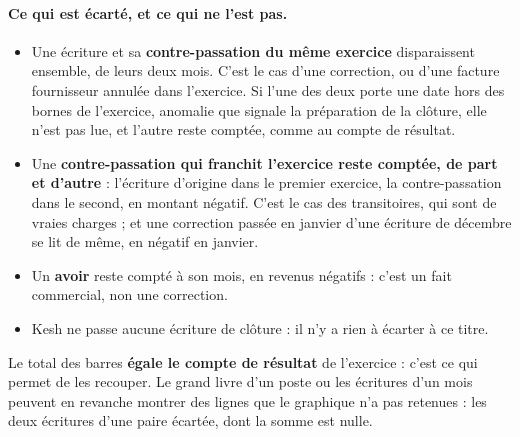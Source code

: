 \documentclass[a4paper,11pt,oneside]{article}
\begin{document}
\paragraph{Ce qui est écarté, et ce qui ne l'est pas.}
\begin{itemize}
    \item Une écriture et sa \textbf{contre-passation du même exercice} disparaissent
    ensemble, de leurs deux mois. C'est le cas d'une correction, ou d'une facture fournisseur
    annulée dans l'exercice. Si l'une des deux porte une date hors des bornes de l'exercice,
    anomalie que signale la préparation de la clôture, elle n'est pas lue, et l'autre reste
    comptée, comme au compte de résultat.
    \item Une \textbf{contre-passation qui franchit l'exercice reste comptée, de part et
    d'autre} : l'écriture d'origine dans le premier exercice, la contre-passation dans le
    second, en montant négatif. C'est le cas des transitoires, qui sont de vraies charges ; et
    une correction passée en janvier d'une écriture de décembre se lit de même, en négatif en
    janvier.
    \item Un \textbf{avoir} reste compté à son mois, en revenus négatifs : c'est un fait
    commercial, non une correction.
    \item Kesh ne passe aucune écriture de clôture : il n'y a rien à écarter à ce titre.
\end{itemize}
Le total des barres \textbf{égale le compte de résultat} de l'exercice : c'est ce qui permet
de les recouper. Le grand livre d'un poste ou les écritures d'un mois peuvent en revanche
montrer des lignes que le graphique n'a pas retenues : les deux écritures d'une paire écartée,
dont la somme est nulle.
\end{document}
